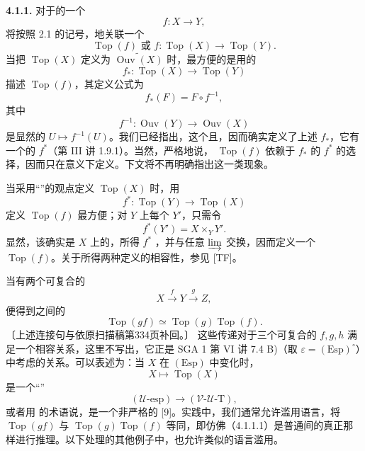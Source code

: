 \textbf{4.1.1.} 对于的一个
\[
 f:X\longrightarrow Y,
\]
将按照 2.1 的记号，地关联一个
\[
 \operatorname{Top}(f)\text{ 或 }f:\operatorname{Top}(X)\longrightarrow\operatorname{Top}(Y).
\]
当把 $\operatorname{Top}(X)$ 定义为 $\widetilde{\operatorname{Ouv}(X)}$ 时，最方便的是用的
\[
 f_*:\operatorname{Top}(X)\longrightarrow\operatorname{Top}(Y)
\]
描述 $\operatorname{Top}(f)$，其定义公式为
\[
 f_*(F)=F\circ f^{-1},
\]
其中
\[
 f^{-1}:\operatorname{Ouv}(Y)\longrightarrow\operatorname{Ouv}(X)
\]
是显然的 $U\mapsto f^{-1}(U)$。我们已经指出，这个且，因而确实定义了上述 $f_*$，它有一个的 $f^*$（第 III 讲 1.9.1）。当然，严格地说， $\operatorname{Top}(f)$ 依赖于 $f_*$ 的 $f^*$ 的选择，因而只在意义下定义。下文将不再明确指出这一类现象。

当采用“”的观点定义 $\operatorname{Top}(X)$ 时，用
\[
 f^*:\operatorname{Top}(Y)\longrightarrow\operatorname{Top}(X)
\]
定义 $\operatorname{Top}(f)$ 最方便；对 $Y$ 上每个 $Y'$，只需令
\[
 f^*(Y')=X\times_Y Y'.
\]
显然，该确实是 $X$ 上的，所得 $f^*$ ，并与任意 $\varinjlim$ 交换，因而定义一个 $\operatorname{Top}(f)$。关于所得两种定义的相容性，参见 [TF]。

当有两个可复合的
\[
 X\xrightarrow{f}Y\xrightarrow{g}Z,
\]
便得到之间的
\[
\operatorname{Top}(gf)\simeq\operatorname{Top}(g)\operatorname{Top}(f).
\]
〔上述连接句与依原扫描稿第334页补回。〕
这些传递对于三个可复合的 $f,g,h$ 满足一个相容关系，这里不写出，它正是 SGA 1 第 VI 讲 7.4 B)（取 $\varepsilon=(\mathrm{Esp})^\circ$）中考虑的关系。可以表述为：当 $X$ 在 $(\mathrm{Esp})$ 中变化时，
\[
 X\longmapsto\operatorname{Top}(X)
\]
是一个“”
\[
 (\mathcal U\text{-}\mathrm{esp})\longrightarrow(\mathcal V\text{-}\mathcal U\text{-}\mathrm T),\tag{4.1.1.1}
\]
或者用 的术语说，是一个非严格的  [9]。实践中，我们通常允许滥用语言，将 $\operatorname{Top}(gf)$ 与 $\operatorname{Top}(g)\operatorname{Top}(f)$ 等同，即仿佛（4.1.1.1）是普通间的真正那样进行推理。以下处理的其他例子中，也允许类似的语言滥用。

